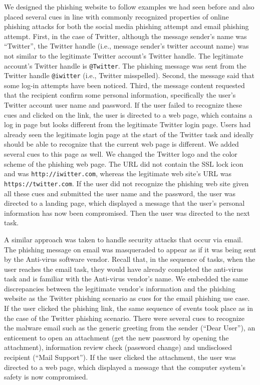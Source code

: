 We designed the phishing website to follow examples we had seen before and also placed several cues in line with commonly recognized properties of online phishing attacks \cite{ftc2019} for both the social media phishing attempt and email phishing attempt. First, in the case of Twitter, although the message sender's name was ``Twitter'', the Twitter handle (i.e., message sender's twitter account name) was not similar to the legitimate Twitter account's Twitter handle. The legitimate account's Twitter handle is \texttt{@Twitter}. The phishing message was sent from the Twitter handle \texttt{@iwitter} (i.e., Twitter misspelled). Second, the message said that some log-in attempts have been noticed. Third, the message content requested that the recipient confirm some personal information, specifically the user's Twitter account user name and password. If the user failed to recognize these cues and clicked on the link, the user is directed to a web page, which contains a log in page but looks different from the legitimate Twitter login page. Users had already seen the legitimate login page at the start of the Twitter task and ideally should be able to recognize that the current web page is different. We added several cues to this page as well. We changed the Twitter logo and the color scheme of the phishing web page. The URL did not contain the SSL lock icon and was \texttt{http://iwitter.com}, whereas the legitimate web site's URL was \texttt{https://twitter.com}. If the user did not recognize the phishing web site given all these cues and submitted the user name and the password, the user was directed to a landing page, which displayed a message that the user's personal information has now been compromised. Then the user was directed to the next task.

A similar approach was taken to handle security attacks that occur via email. The phishing message on email was masqueraded to appear as if it was being sent by the Anti-virus software vendor. Recall that, in the sequence of tasks, when the user reaches the email task, they would have already completed the anti-virus task and is familiar with the Anti-virus vendor's name. We embedded the same discrepancies between the legitimate vendor's information and the phishing website as the Twitter phishing scenario as cues for the email phishing use case. If the user clicked the phishing link, the same sequence of events took place as in the case of the Twitter phishing scenario. There were several cues to recognize the malware email such as the generic greeting from the sender (``Dear User''), an enticement to open an attachment (get the new password by opening the attachment), information review check (password change) and undisclosed recipient (``Mail Support''). If the user clicked the attachment, the user was directed to a web page, which displayed a message that the computer system's safety is now compromised.


